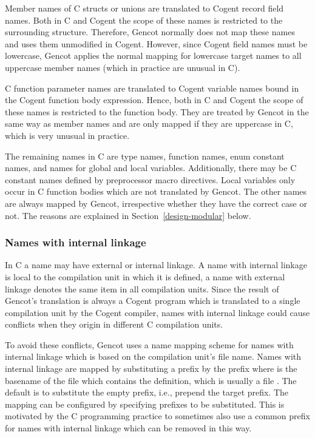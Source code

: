 Member names of C structs or unions are translated to Cogent record field names. Both in C and Cogent the scope of these
names is restricted to the surrounding structure. Therefore, Gencot normally does not map these names and uses them unmodified
in Cogent. However, since Cogent field names must be lowercase, Gencot applies the normal mapping for lowercase target 
names to all uppercase member names (which in practice are unusual in C). 

C function parameter names are translated to Cogent variable names bound in the Cogent function body expression. Hence, both
in C and Cogent the scope of these names is restricted to the function body. They are treated by Gencot in the same way as 
member names and are only mapped if they are uppercase in C, which is very unusual in practice.

The remaining names in C are type names, function names, enum constant names, and names for global and local variables.
Additionally, there may be C constant names defined by preprocessor macro directives.
Local variables only occur in C function bodies which are not translated by Gencot. The other names are always mapped by
Gencot, irrespective whether they have the correct case or not. The reasons are explained in Section~\ref{design-modular}
below.

\subsubsection{Names with internal linkage}

In C a name may have external or internal linkage. A name with internal linkage is local to the compilation unit in which it
is defined, a name with external linkage denotes the same item in all compilation units. Since the result of Gencot's 
translation is always a Cogent program which is translated to a single compilation unit by the Cogent compiler, names 
with internal linkage could cause conflicts when they origin in different C compilation units.

To avoid these conflicts, Gencot uses a name mapping scheme for names with internal linkage which is based on the 
compilation unit's file name. Names with internal linkage are mapped by substituting a prefix by the prefix 
where  is the basename of the file which contains the definition, which is usually a file . The default
is to substitute the empty prefix, i.e., prepend the target prefix. The mapping can be configured by specifying prefixes
to be substituted. This is motivated by the C programming practice to sometimes also use a common prefix for names 
with internal linkage which can be removed in this way.

